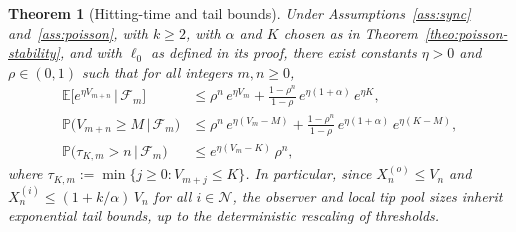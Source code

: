 \documentclass[a4paper,12pt,oneside,reqno]{amsart}
\newcommand{\Nodes}{{\mathcal N}}
\renewcommand{\P}{{\mathbb P}}
\newcommand{\E}{{\mathbb E}}
\newcommand{\F}{{\mathcal F}}
\newcommand{\1}{{\mathbf 1}}
\newtheorem{theo}{Theorem}[section]
\begin{document}
\begin{theo}[Hitting-time and tail bounds]\label{theo:hitting}
Under Assumptions~\ref{ass:sync} and~\ref{ass:poisson}, with $k\ge 2$, with $\alpha$ and $K$ chosen as in Theorem~\ref{theo:poisson-stability}, and with $\ell_0$ as defined in its proof, there exist constants $\eta>0$ and $\rho\in(0,1)$ such that for all integers $m,n\ge 0$,
\begin{align}
    \E\bigl[e^{\eta V_{m+n}} \,\big\vert\, \F_m\bigr]
      &\le \rho^n\, e^{\eta V_m}
           + \frac{1-\rho^n}{1-\rho}\,e^{\eta(1+\alpha)}\,e^{\eta K},
      \label{eq:exp-moment}\\[0.4em]
    \P\bigl(V_{m+n}\ge M \,\big\vert\, \F_m\bigr)
      &\le \rho^n\, e^{\eta(V_m - M)}
           + \frac{1-\rho^n}{1-\rho}\,e^{\eta(1+\alpha)}\,e^{\eta(K-M)},
      \label{eq:tail-bound}\\[0.4em]
    \P\bigl(\tau_{K,m}>n \,\big\vert\, \F_m\bigr)
      &\le e^{\eta(V_m - K)}\,\rho^n,
      \label{eq:return-time}
\end{align}
where $\tau_{K,m}:=\min\{j\ge 0: V_{m+j}\le K\}$. In particular, since $X_n^{(o)}\le V_n$ and $X_n^{(i)}\le (1+k/\alpha)\,V_n$ for all $i\in\Nodes$, the observer and local tip pool sizes inherit exponential tail bounds, up to the deterministic rescaling of thresholds.
\end{theo}
\end{document}
